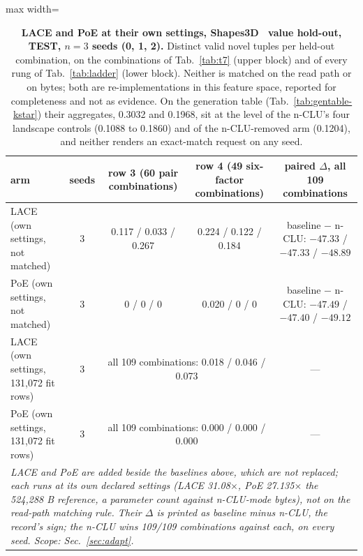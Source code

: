 \documentclass{article} %
\begin{document}
\begin{table}[h]
\centering\scriptsize
\caption{\textbf{LACE and PoE at their own settings, Shapes3D~\citep{3dshapes18,kim_disentangling_2019} value hold-out, TEST, $n=3$ seeds (0, 1,
2).} Distinct valid novel tuples per held-out combination, on the combinations of Tab.~\ref{tab:t7} (upper block) and of
every rung of Tab.~\ref{tab:ladder} (lower block). Neither is matched on the read path or on bytes;
both are re-implementations in this feature space, reported for completeness and not as evidence. On
the generation table (Tab.~\ref{tab:gentable-kstar}) their aggregates, 0.3032 and 0.1968, sit at the %
level of the n-CLU's four landscape controls (0.1088 to 0.1860) and of the n-CLU-removed arm %
(0.1204), and neither renders an exact-match request on any seed.} %
\label{tab:lace-poe}
\setlength{\tabcolsep}{2.6pt}
\begin{adjustbox}{max width=\linewidth}\begin{tabular}{lcccc}
\toprule
arm & seeds & row 3 (60 pair combinations) & row 4 (49 six-factor combinations) & paired $\Delta$, all 109 combinations \\ %
\midrule
LACE (own settings, not matched) & 3 & 0.117 / 0.033 / 0.267 & 0.224 / 0.122 / 0.184 & baseline $-$ n-CLU: $-47.33$ / $-47.33$ / $-48.89$ \\
PoE (own settings, not matched) & 3 & 0 / 0 / 0 & 0.020 / 0 / 0 & baseline $-$ n-CLU: $-47.49$ / $-47.40$ / $-49.12$ \\
LACE (own settings, 131,072 fit rows) & 3 & \multicolumn{2}{c}{all 109 combinations: 0.018 / 0.046 / 0.073} & --- \\ %
PoE (own settings, 131,072 fit rows) & 3 & \multicolumn{2}{c}{all 109 combinations: 0.000 / 0.000 / 0.000} & --- \\ %
\multicolumn{5}{p{15cm}}{\emph{LACE and PoE are added beside the baselines above, which are not replaced; each runs at its own declared settings (LACE 31.08$\times$, PoE 27.135$\times$ the 524,288 B reference, a parameter count against n-CLU-mode bytes), not on the read-path matching rule. Their $\Delta$ is printed as baseline minus n-CLU, the record's sign; the n-CLU wins 109/109 combinations against each, on every seed. Scope: Sec.~\ref{sec:adapt}.}} \\ %
\bottomrule
\end{tabular}\end{adjustbox}


\end{table}
\end{document}
